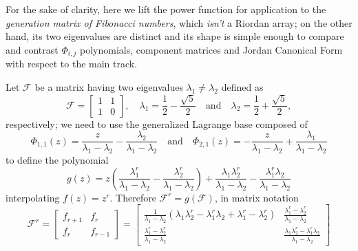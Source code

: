 
\begin{example}
For the sake of clarity, here we lift the power function for application to the
\textit{generation matrix of Fibonacci numbers}, which \textit{isn't} a Riordan
array; on the other hand, its two eigenvalues are distinct and its shape is
simple enough to compare and contrast $\Phi_{i,j}$ polynomials, component
matrices and Jordan Canonical Form with respect to the main track.

Let $\mathcal{F}$ be a matrix having two eigenvalues $\lambda_{1}\neq
\lambda_{2}$ defined as
\begin{displaymath}
\mathcal{F} = \left[\begin{matrix}1 & 1\\1 & 0\end{matrix}\right],
\quad  \lambda_{1} =  \frac{1}{2}- \frac{\sqrt{5}}{2}
\quad\text{and}\quad \lambda_{2} = \frac{1}{2} + \frac{\sqrt{5}}{2},
\end{displaymath}
respectively; we need to use the generalized Lagrange base composed of
\begin{displaymath}
\Phi_{ 1, 1 }{\left (z \right )} = \frac{z}{\lambda_{1} - \lambda_{2}} - \frac{\lambda_{2}}{\lambda_{1} - \lambda_{2}} 
\quad\text{and}\quad \Phi_{ 2, 1 }{\left (z \right )} = - \frac{z}{\lambda_{1} - \lambda_{2}} + \frac{\lambda_{1}}{\lambda_{1} - \lambda_{2}}
\end{displaymath}
to define the polynomial
\begin{displaymath}
g{\left (z \right )} = z \left(\frac{\lambda_{1}^{r}}{\lambda_{1} - \lambda_{2}} - \frac{\lambda_{2}^{r}}{\lambda_{1} - \lambda_{2}}\right) + \frac{\lambda_{1} \lambda_{2}^{r}}{\lambda_{1} - \lambda_{2}} - \frac{\lambda_{1}^{r} \lambda_{2}}{\lambda_{1} - \lambda_{2}}
\end{displaymath}
interpolating $f(z)=z^{r}$. Therefore $\mathcal{F}^{r} = g(\mathcal{F})$, in
matrix notation
\begin{displaymath}
\mathcal{F}^{r} = \left[\begin{matrix}f_{r+1} & f_{r}\\f_{r} & f_{r-1}\end{matrix}\right] =\left[\begin{matrix}\frac{1}{\lambda_{1} - \lambda_{2}} \left(\lambda_{1} \lambda_{2}^{r} - \lambda_{1}^{r} \lambda_{2} + \lambda_{1}^{r} - \lambda_{2}^{r}\right) & \frac{\lambda_{1}^{r} - \lambda_{2}^{r}}{\lambda_{1} - \lambda_{2}}\\\frac{\lambda_{1}^{r} - \lambda_{2}^{r}}{\lambda_{1} - \lambda_{2}} & \frac{\lambda_{1} \lambda_{2}^{r} - \lambda_{1}^{r} \lambda_{2}}{\lambda_{1} - \lambda_{2}}\end{matrix}\right]

\end{displaymath}
\end{example}
